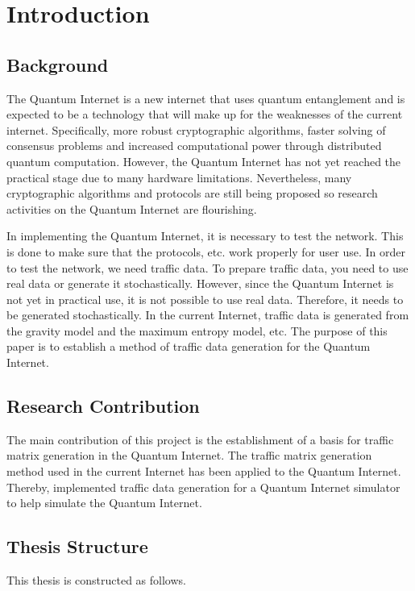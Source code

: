 \chapter{Introduction}
\label{introduction}

\section{Background}
\label{introduction:background}
The Quantum Internet is a new internet that uses quantum entanglement and is expected to be a technology that will make up for the weaknesses of the current internet.
Specifically, more robust cryptographic algorithms, faster solving of consensus problems and increased computational power through distributed quantum computation. 
However, the Quantum Internet has not yet reached the practical stage due to many hardware limitations. 
Nevertheless, many cryptographic algorithms and protocols are still being proposed so research activities on the Quantum Internet are flourishing.

In implementing the Quantum Internet, it is necessary to test the network. 
This is done to make sure that the protocols, etc. work properly for user use. 
In order to test the network, we need traffic data. 
To prepare traffic data, you need to use real data or generate it stochastically.
However, since the Quantum Internet is not yet in practical use, it is not possible to use real data.
Therefore, it needs to be generated stochastically.
In the current Internet, traffic data is generated from the gravity model and the maximum entropy model, etc.
The purpose of this paper is to establish a method of traffic data generation for the Quantum Internet.

\section{Research Contribution}
\label{introduction:research_contribution}
The main contribution of this project is the establishment of a basis for traffic matrix generation in the Quantum Internet.
The traffic matrix generation method used in the current Internet has been applied to the Quantum Internet.
Thereby, implemented traffic data generation for a Quantum Internet simulator to help simulate the Quantum Internet.

\section{Thesis Structure}
\label{introduction:thesis_structure}
This thesis is constructed as follows.


